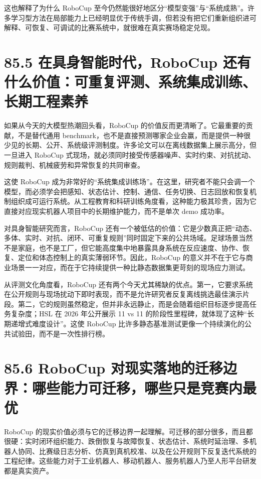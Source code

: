 这也解释了为什么 RoboCup 至今仍然能很好地区分“模型变强”与“系统成熟”。许多学习型方法在局部能力上已经明显优于传统手调，但若没有把它们重新组织进可解释、可恢复、可调试的比赛系统中，就很难在真实赛场稳定兑现。

\section*{85.5 在具身智能时代，RoboCup 还有什么价值：可重复评测、系统集成训练、长期工程素养}


如果从今天的大模型热潮回头看，RoboCup 的价值反而更清晰了。它最重要的贡献，不是替代通用 benchmark，也不是直接预测哪家企业会赢，而是提供一种很少见的长期、公开、系统级评测制度。许多论文可以在离线数据集上展示高分，但一旦进入 RoboCup 式现场，就必须同时接受传感器噪声、实时约束、对抗扰动、规则裁判、机械疲劳和异常恢复的共同审查。

这使 RoboCup 成为非常好的“系统集成训练场”。在这里，研究者不能只会调一个模型，而必须学会把感知、状态估计、控制、通信、任务切换、日志回放和恢复机制组织成可运行系统。从工程教育和科研训练角度看，这种能力极其珍贵，因为它直接对应现实机器人项目中的长期维护能力，而不是单次 demo 成功率。

对具身智能研究而言，RoboCup 还有一个被低估的价值：它是少数真正把“动态、多体、实时、对抗、闭环、可重复规则”同时固定下来的公共场域。足球场景当然不是家庭，也不是工厂，但它能高度集中地暴露具身系统在反应速度、协作、恢复、定位和体态控制上的真实薄弱环节。因此，RoboCup 的意义并不在于它与商业场景一一对应，而在于它持续提供一种比静态数据集更苛刻的现场应力测试。

从评测文化角度看，RoboCup 还有两个今天尤其稀缺的优点。第一，它要求系统在公开规则与现场扰动下即时表现，而不是允许研究者反复离线挑选最佳演示片段。第二，它的规则虽然稳定，但并非永远静止，而是会随着组织目标逐步提高任务复杂度；HSL 在 2026 年公开展示 11 vs 11 的阶段性里程碑，就体现了这种“长期递增式难度设计”。这使 RoboCup 比许多静态基准测试更像一个持续演化的公共试验田，而不是一次性排行榜。

\section*{85.6 RoboCup 对现实落地的迁移边界：哪些能力可迁移，哪些只是竞赛内最优}


RoboCup 的现实价值必须与它的迁移边界一起理解。可迁移的部分很多，而且都很硬：实时闭环组织能力、跌倒恢复与故障恢复、状态估计、系统时延治理、多机器人协同、比赛级日志分析、仿真到真机校准、以及在公开规则下反复迭代系统的工程纪律。这些能力对于工业机器人、移动机器人、服务机器人乃至人形平台研发都是真实资产。


